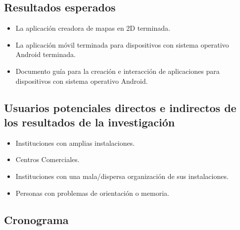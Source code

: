 \documentclass[letterpaper,11pt]{article}
\begin{document}
	\subsection{Resultados esperados}
	
	\begin{itemize}
		\item La aplicación creadora de mapas en 2D terminada.

		\item La aplicación móvil terminada para dispositivos con
		sistema operativo Android terminada.

		\item Documento guía para la creación e interacción de 
		aplicaciones para dispositivos con sistema operativo Android.

	\end{itemize}

	\subsection{Usuarios potenciales directos e indirectos de los 
	resultados de la  investigación}
	
	\begin{itemize}
		\item Instituciones con amplias instalaciones.

		\item Centros Comerciales.

		\item Instituciones con una mala/dispersa organización de sus 
		instalaciones.

		\item Personas con problemas de orientación o memoria.
	\end{itemize}

	\subsection{Cronograma}
			
\end{document}

